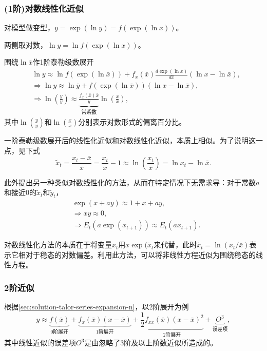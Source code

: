 \subsubsection{(1阶)对数线性化近似}
对模型做变型，$y=\exp(\ln y) = f(\exp (\ln x))$。

两侧取对数，$\ln y = \ln f(\exp (\ln x))$。

围绕$\ln \bar{x}$作1阶泰勒级数展开
\begin{equation}
  \begin{split}
    &\ln y \approx \ln f(\exp (\ln \bar{x})) + f_x (\bar{x}) \frac{d \exp(\ln x)}{d \bar{x}}  \left( \ln x - \ln \bar{x} \right), \\
    & \Rightarrow \ln y \approx \ln \bar{y} + f(\exp ( \ln \bar{x})) \left( \ln x - \ln \bar{x} \right), \\
    & \Rightarrow \ln \left(\frac{y}{\bar{y}}\right) \approx \underbrace{\frac{f_x (\bar{x}) \bar{x}}{\bar{y}}}_{\text{常系数}} \ln \left( \frac{x}{\bar{x}} \right),
  \end{split}
  \end{equation}
  其中$\ln \left(\frac{y}{\bar{y}}\right)$和$\ln \left( \frac{x}{\bar{x}} \right)$分别表示对数形式的偏离百分比。

一阶泰勒级数展开后的线性化近似和对数线性化近似，本质上相似。为了说明这一点，见下式
\begin{equation*}
  \tilde{x}_t = \frac{x_t - \bar{x}}{\bar{x}} = \frac{x_t}{\bar{x}} - 1 \approx \ln \left(\frac{x_t}{\bar{x}}\right) = \ln x_t - \ln \bar{x}.
\end{equation*}

此外\cite{Uhlig:1999vx}提出另一种类似对数线性化的方法，从而在特定情况下无需求导：对于常数$a$和接近$0$的$\tilde{x}_t$和$\tilde{y}_t$，
\begin{equation*}
  \begin{split}
    &\exp (x + ay) \approx 1 + x + ay, \\
    &\Rightarrow x y \approx 0, \\
    & \Rightarrow E_t \left( a \exp (x_{t+1}) \right) \approx E_t \left( a x_{t+1} \right).
  \end{split}
\end{equation*}

对数线性化方法的本质在于将变量$x_t$用$x \exp (\tilde{x}_t$来代替，此时$\tilde{x}_t = \ln (x_t/\bar{x})$表示它相对于稳态的对数偏差。利用此方法，可以将非线性方程近似为围绕稳态的线性方程。

\subsubsection{2阶近似}
根据\eqref{sec:solution-talor-series-expansion-n}，以2阶展开为例
\begin{equation}
  \label{sec:solution-talor-series-expansion-2}
  y \approx \underbrace{f(\bar{x})}_{\text{0阶展开}} + \underbrace{f_{x}(\bar{x}) (x-\bar{x})}_{\text{1阶展开}} + \underbrace{\frac{1}{2} f_{xx}(\bar{x}) \left(x-\bar{x}\right)^2}_{\text{2阶展开}} + \underbrace{O^3}_{\text{误差项}},
\end{equation}
其中线性近似的误差项$O^3$是由忽略了3阶及以上阶数近似所造成的。

